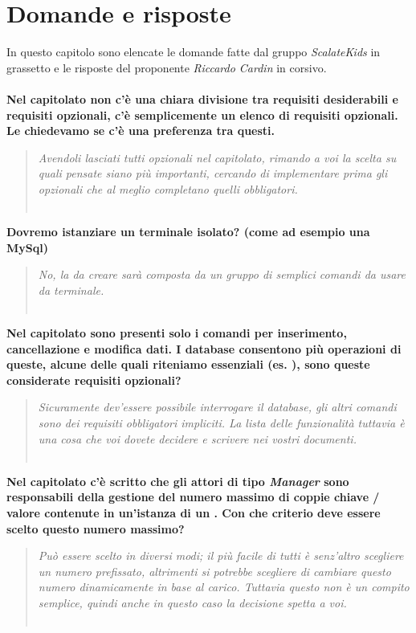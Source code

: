 \documentclass{scalatekids-article}
\begin{document}
\section{Domande e risposte}
In questo capitolo sono elencate le domande fatte dal gruppo \textit{ScalateKids} in grassetto e le risposte del proponente \textit{Riccardo Cardin} in corsivo.
\textbf{\\ \\Nel capitolato non c'è una chiara divisione tra requisiti desiderabili e requisiti opzionali, c'è semplicemente un elenco di requisiti opzionali. Le chiedevamo se c'è una preferenza tra questi.}
\begin{quote}
  \textit{Avendoli lasciati tutti opzionali nel capitolato, rimando a voi la scelta su quali pensate siano più importanti, cercando di implementare prima gli opzionali che al meglio completano quelli obbligatori.\\ \\}
\end{quote}
\textbf{Dovremo istanziare un terminale isolato? (come ad esempio una  MySql)}
\begin{quote}
  \textit{No, la  da creare sarà composta da un gruppo di semplici comandi da usare da terminale.\\ \\}
\end{quote}
\textbf{Nel capitolato sono presenti solo i comandi per inserimento, cancellazione e modifica dati. I database consentono più operazioni di queste, alcune delle quali riteniamo essenziali (es. ), sono queste considerate requisiti opzionali?}
\begin{quote}
  \textit{Sicuramente dev'essere possibile interrogare il database, gli altri comandi sono dei requisiti obbligatori impliciti. La lista delle funzionalità tuttavia è una cosa che voi dovete decidere e scrivere nei vostri documenti.\\ \\}
\end{quote}
\textbf{Nel capitolato c'è scritto che gli attori di tipo \textit{Manager} sono responsabili della gestione del numero massimo di coppie chiave / valore contenute in un’istanza di un . Con che criterio deve essere scelto questo numero massimo?}
\begin{quote}
  \textit{Può essere scelto in diversi modi; il più facile di tutti è senz'altro scegliere un numero prefissato, altrimenti si potrebbe scegliere di cambiare questo numero dinamicamente in base al carico. Tuttavia questo non è un compito semplice, quindi anche in questo caso la decisione spetta a voi.\\ \\}
\end{quote}
\end{document}
